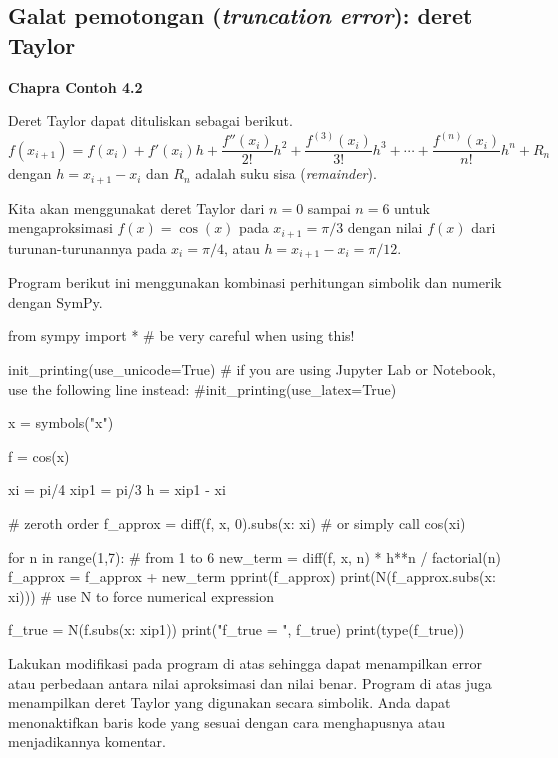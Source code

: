 \subsection{Galat pemotongan (\textit{truncation error}): deret Taylor}

\textbf{Chapra Contoh 4.2}

Deret Taylor dapat dituliskan sebagai berikut.
\begin{equation}
f(x_{i+1}) = f(x_{i}) + f'(x_{i}) h + \frac{f''(x_{i})}{2!}h^2 + 
\frac{f^{(3)}(x_{i})}{3!}h^3 + \cdots +
\frac{f^{(n)}(x_{i})}{n!}h^n + R_{n}
\end{equation}
dengan $h = x_{i+1} - x_{i}$ dan $R_{n}$ adalah suku sisa (\textit{remainder}).

Kita akan menggunakat deret Taylor dari $n=0$ sampai $n=6$ untuk mengaproksimasi
$f(x) = \cos(x)$ pada $x_{i+1} = \pi/3$ dengan nilai $f(x)$ dari turunan-turunannya
pada $x_{i} = \pi/4$, atau $h = x_{i+1} - x_{i} = \pi/12$.

Program berikut ini menggunakan kombinasi perhitungan simbolik dan numerik
dengan SymPy.
\begin{pythoncode}
from sympy import * # be very careful when using this!

init_printing(use_unicode=True)
# if you are using Jupyter Lab or Notebook, use the following line instead:
#init_printing(use_latex=True)

x = symbols("x")

f = cos(x)

xi = pi/4
xip1 = pi/3
h = xip1 - xi

# zeroth order
f_approx = diff(f, x, 0).subs({x: xi}) # or simply call cos(xi)

for n in range(1,7): # from 1 to 6
    new_term = diff(f, x, n) * h**n / factorial(n)
    f_approx = f_approx + new_term
    pprint(f_approx)
    print(N(f_approx.subs({x: xi}))) # use N to force numerical expression

f_true = N(f.subs({x: xip1}))
print("f_true = ", f_true)
print(type(f_true))
\end{pythoncode}


\begin{soal}
Lakukan modifikasi pada program di atas sehingga dapat menampilkan error atau
perbedaan antara nilai aproksimasi dan nilai benar. Program di atas juga menampilkan
deret Taylor yang digunakan secara simbolik. Anda dapat menonaktifkan baris
kode yang sesuai dengan cara menghapusnya atau menjadikannya komentar.
\end{soal}

